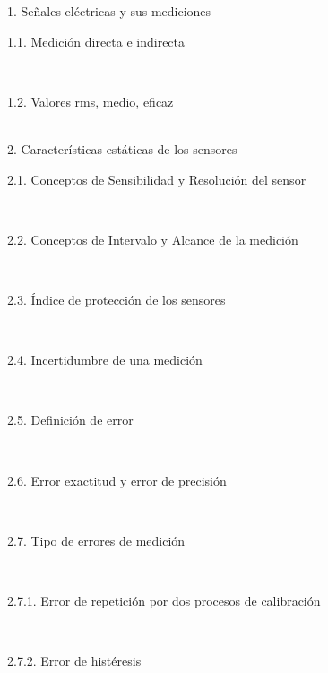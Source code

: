 \documentclass[letterpaper]{article}%
\begin{document}
\begin{tcolorbox}[
blanker,
width=0.78\textwidth,enlarge left by=0.24\textwidth,
before skip=6pt,
breakable,
overlay unbroken and first={%
    \node[inner sep=0pt,outer sep=0pt,text width=0.22\textwidth,
    align=none,
    below right]
    at ([xshift=-0.24\textwidth]frame.north west)
{
\hspace*{0mm}\fontsize{12}{14}\selectfont \textbf{\textcolor{parte}{4 Contenidos}}
};}]
1. Señales eléctricas y sus mediciones\\
\hspace*{0.02\linewidth}\parbox{0.98\linewidth}{\strut 1.1. Medición directa e indirecta\strut}\\
\hspace*{0.02\linewidth}\parbox{0.98\linewidth}{\strut 1.2. Valores rms, medio, eficaz\strut}\\
2. Características estáticas de los sensores\\
\hspace*{0.02\linewidth}\parbox{0.98\linewidth}{\strut 2.1. Conceptos de Sensibilidad y Resolución del sensor\strut}\\
\hspace*{0.02\linewidth}\parbox{0.98\linewidth}{\strut 2.2. Conceptos de Intervalo y Alcance de la medición\strut}\\
\hspace*{0.02\linewidth}\parbox{0.98\linewidth}{\strut 2.3. Índice de protección de los sensores\strut}\\
\hspace*{0.02\linewidth}\parbox{0.98\linewidth}{\strut 2.4. Incertidumbre de una medición\strut}\\
\hspace*{0.02\linewidth}\parbox{0.98\linewidth}{\strut 2.5. Definición de error\strut}\\
\hspace*{0.02\linewidth}\parbox{0.98\linewidth}{\strut 2.6. Error exactitud y error de precisión\strut}\\
\hspace*{0.02\linewidth}\parbox{0.98\linewidth}{\strut 2.7. Tipo de errores de medición\strut}\\
\hspace*{0.04\linewidth}\parbox{0.96\linewidth}{\strut 2.7.1. Error de repetición por dos procesos de calibración\strut}\\
\hspace*{0.04\linewidth}\parbox{0.96\linewidth}{\strut 2.7.2. Error de histéresis\strut}\\

\end{tcolorbox}
\end{document}
